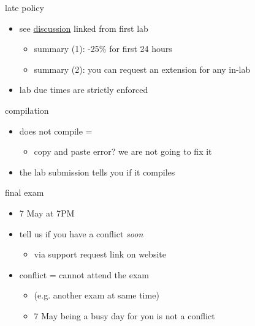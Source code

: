 \begin{frame}{late policy}
    \begin{itemize}
    \item see \href{https://markfloryan.github.io/pdr/uva/labduedates.html}{discussion} linked from first lab
        \begin{itemize}
            \item summary (1): -25\% for first 24 hours
            \item summary (2): you can request an extension for any in-lab
        \end{itemize}
        \vspace{.5cm}
    \item lab due times are strictly enforced
    \end{itemize}
\end{frame}

\begin{frame}{compilation}
    \begin{itemize}
    \item does not compile = 
        \begin{itemize}
        \item copy and paste error? we are not going to fix it
        \end{itemize}
    \vspace{.5cm}
    \item the lab submission tells you if it compiles
    \end{itemize}
\end{frame}

\begin{frame}{final exam}
    \begin{itemize}
    \item 7 May at 7PM
    \item tell us if you have a conflict \textit{soon}
        \begin{itemize}
        \item via support request link on website
        \end{itemize}
    \item conflict = cannot attend the exam
        \begin{itemize}
        \item (e.g. another exam at same time)
        \item 7 May being a busy day for you is not a conflict
        \end{itemize}
    \end{itemize}
\end{frame}
